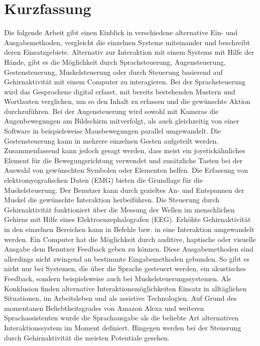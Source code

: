 \chapter{Kurzfassung}

Die folgende Arbeit gibt einen Einblick in verschiedene alternative Ein- und Ausgabemethoden, vergleicht die einzelnen Systeme miteinander und beschreibt deren Einsatzgebiete.
\newline \newline
Alternativ zur Interaktion mit einem Systems mit Hilfe der Hände, gibt es die Möglichkeit durch Sprachsteuerung, Augensteuerung, Gestensteuerung, Muskelsteuerung oder durch Steuerung basierend auf Gehirnaktivität mit einem Computer zu interagieren. Bei der Sprachsteuerung wird das Gesprochene digital erfasst, mit bereits bestehenden Mustern und Wortlauten verglichen, um so den Inhalt zu erfassen und die gewünschte Aktion durchzuführen. Bei der Augensteuerung wird sowohl mit Kameras die Augenbewegungen am Bildschirm mitverfolgt, als auch gleichzeitig von einer Software in beispielsweise Mausbewegungen parallel umgewandelt. Die Gestensteuerung kann in mehrere einzelnen Gesten aufgeteilt werden. Zusammenfassend kann jedoch gesagt werden, dass meist ein joystickähnliches Element für die Bewegungsrichtung verwendet und zusätzliche Tasten bei der Auswahl von gewünschten Symbolen oder Elementen helfen. Die Erfassung von elektromyografischen Daten (EMG) bieten die Grundlage für die Muskelsteuerung. Der Benutzer kann durch gezieltes An- und Entspannen der Muskel die gewünschte Interaktion herbeiführen. Die Steuerung durch Gehirnaktivität funktioniert über die Messung der Wellen im menschlichen Gehirns mit Hilfe eines  Elektroenzephalografen (EEG). Erhöhte Gehirnaktivität in den einzelnen Bereichen kann in Befehle bzw. in eine Interaktion umgewandelt werden.
\newline \newline
Ein Computer hat die Möglichkeit durch auditive, haptische oder visuelle Ausgabe dem Benutzer Feedback geben zu können. Diese Ausgabemethoden sind allerdings nicht zwingend an bestimmte Eingabemethoden gebunden. So gibt es nicht nur bei Systemen, die über die Sprache gesteuert werden, ein akustisches Feedback, sondern beispielsweise auch bei Muskelsteuerungssystemen.
\newline \newline
Als Konklusion finden alternative Interaktionsmöglichkeiten Einsatz in alltäglichen Situationen, im Arbeitsleben und als assistive Technologien. Auf Grund des momentanen Beliebtheitsgrades von Amazon Alexa und weiteren Sprachassistenten wurde die Sprachausgabe als die beliebte Art alternativen Interaktionssystem im Moment definiert. Hingegen werden bei der Steuerung durch Gehirnaktivität die meisten Potentiale gesehen.
